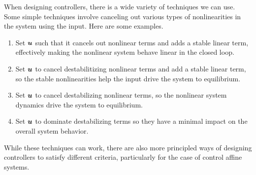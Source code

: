 When designing controllers, there is a wide variety of techniques we can use.
Some simple techniques involve canceling out various types of nonlinearities in
the system using the input. Here are some examples.
\begin{enumerate}
	\item Set $\boldsymbol{u}$ such that it cancels out nonlinear terms and adds a stable
		linear term, effectively making the nonlinear system behave linear in the
		closed loop.
	\item Set $\boldsymbol{u}$ to cancel destabilitizing nonlinear terms and add a stable
		linear term, so the stable nonlinearities help the input drive the system to
		equilibrium.
	\item Set $\boldsymbol{u}$ to cancel destabilizing nonlinear terms, so the nonlinear
		system dynamics drive the system to equilibrium.
	\item Set $\boldsymbol{u}$ to dominate destabilizing terms so they have a minimal
		impact on the overall system behavior.
\end{enumerate}
While these techniques can work, there are also more principled ways of
designing controllers to satisfy different criteria, particularly for the case
of control affine systems.

